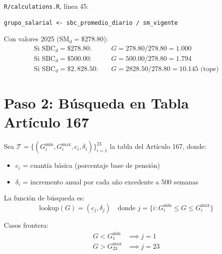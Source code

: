 \documentclass[11pt,a4paper]{report}
\theoremstyle{remark}
\begin{document}
\begin{tcolorbox}[colback=orange!5!white, colframe=orange!75!black, title=\textbf{Aplicaci\'on en C\'odigo}]
\texttt{R/calculations.R}, l\'inea 45:
\begin{lstlisting}
grupo_salarial <- sbc_promedio_diario / sm_vigente
\end{lstlisting}

Con valores 2025 ($\text{SM}_d = \$278.80$):
\begin{align*}
\text{Si SBC}_d = \$278.80: &\quad G = 278.80 / 278.80 = 1.000 \\
\text{Si SBC}_d = \$500.00: &\quad G = 500.00 / 278.80 = 1.794 \\
\text{Si SBC}_d = \$2{,}828.50: &\quad G = 2828.50 / 278.80 = 10.145 \text{ (tope)}
\end{align*}
\end{tcolorbox}

\section{Paso 2: B\'usqueda en Tabla Art\'iculo 167}

\begin{tcolorbox}[colback=blue!5!white, colframe=blue!75!black, title=\textbf{Definici\'on Formal}]
Sea $\mathcal{T} = \{(G_i^{\min}, G_i^{\max}, c_i, \delta_i)\}_{i=1}^{23}$ la tabla del Art\'iculo 167, donde:
\begin{itemize}
  \item $c_i$ = cuant\'ia b\'asica (porcentaje base de pensi\'on)
  \item $\delta_i$ = incremento anual por cada a\~no excedente a 500 semanas
\end{itemize}

La funci\'on de b\'usqueda es:
\begin{equation}
\text{lookup}(G) = (c_j, \delta_j) \quad \text{donde } j = \{i : G_i^{\min} \leq G \leq G_i^{\max}\}
\label{eq:lookup_167}
\end{equation}

Casos frontera:
\begin{align}
G < G_1^{\min} &\implies j = 1 \\
G > G_{23}^{\max} &\implies j = 23
\end{align}
\end{tcolorbox}
\end{document}
